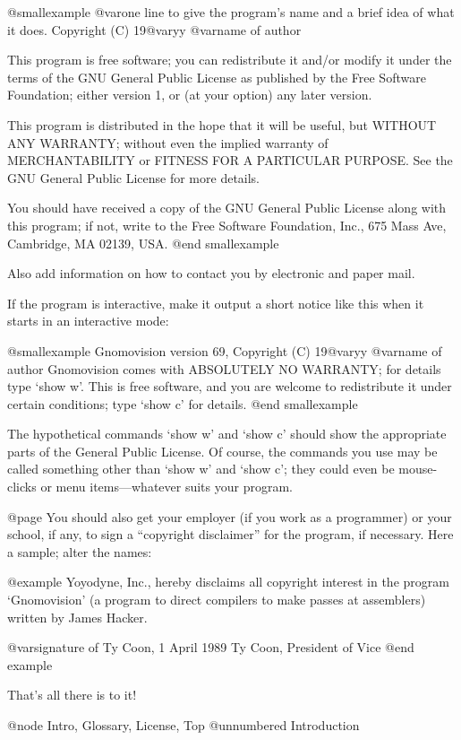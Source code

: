 @smallexample
@var{one line to give the program's name and a brief idea of what it does.}
Copyright (C) 19@var{yy}  @var{name of author}

This program is free software; you can redistribute it and/or modify
it under the terms of the GNU General Public License as published by
the Free Software Foundation; either version 1, or (at your option)
any later version.

This program is distributed in the hope that it will be useful,
but WITHOUT ANY WARRANTY; without even the implied warranty of
MERCHANTABILITY or FITNESS FOR A PARTICULAR PURPOSE.  See the
GNU General Public License for more details.

You should have received a copy of the GNU General Public License
along with this program; if not, write to the Free Software
Foundation, Inc., 675 Mass Ave, Cambridge, MA 02139, USA.
@end smallexample

Also add information on how to contact you by electronic and paper mail.

If the program is interactive, make it output a short notice like this
when it starts in an interactive mode:

@smallexample
Gnomovision version 69, Copyright (C) 19@var{yy} @var{name of author}
Gnomovision comes with ABSOLUTELY NO WARRANTY; for details type `show w'.
This is free software, and you are welcome to redistribute it
under certain conditions; type `show c' for details.
@end smallexample

The hypothetical commands `show w' and `show c' should show the
appropriate parts of the General Public License.  Of course, the
commands you use may be called something other than `show w' and `show
c'; they could even be mouse-clicks or menu items---whatever suits your
program.

@page
You should also get your employer (if you work as a programmer) or your
school, if any, to sign a ``copyright disclaimer'' for the program, if
necessary.  Here a sample; alter the names:

@example
Yoyodyne, Inc., hereby disclaims all copyright interest in the
program `Gnomovision' (a program to direct compilers to make passes
at assemblers) written by James Hacker.

@var{signature of Ty Coon}, 1 April 1989
Ty Coon, President of Vice
@end example

That's all there is to it!

@node Intro, Glossary, License, Top
@unnumbered Introduction

